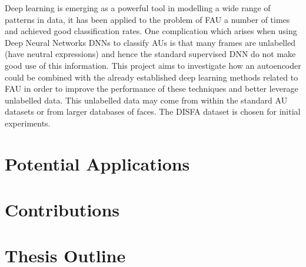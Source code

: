 Deep learning is emerging as a powerful tool in modelling a wide range of patterns
in data, it has been applied to the problem of FAU a number of times and achieved
good classification rates. One complication which arises when using Deep Neural
Networks DNNs to classify AUs is that many frames are unlabelled (have neutral expressions)
and hence the standard supervised DNN do not make good use of this information.
This project aims to investigate how an autoencoder could be combined with the
already established deep learning methods related to FAU in order to improve the performance
of these techniques and better leverage unlabelled data. This unlabelled data may
come from within the standard AU datasets or from larger databases of faces.
The DISFA dataset is chosen for initial experiments.
\section{Potential Applications}
\section{Contributions}
\section{Thesis Outline}
